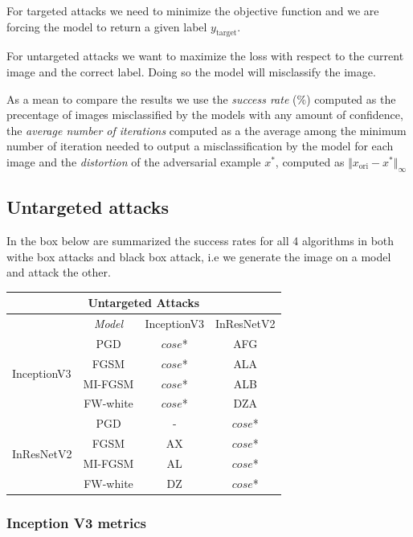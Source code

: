 \documentclass[10pt,twocolumn,letterpaper, english]{article}
\theoremstyle{definition}
\theoremstyle{plain}
\theoremstyle{plain}
\theoremstyle{plain}
\theoremstyle{plain}
\theoremstyle{remark}
\theoremstyle{remark}
\theoremstyle{definition}
\theoremstyle{definition}
\theoremstyle{definition}
\theoremstyle{definition}
\begin{document}
For targeted attacks we need to minimize the objective function and we are forcing the model to return a given label $y_{\text{target}}$.

For untargeted attacks we want to maximize the loss with respect to the current image and the correct label. Doing so the model will misclassify the image.

As a mean to compare the results we use the \textit{success rate} ($\%$) computed as the precentage of images misclassified by the models with any amount of confidence, the \textit{average number of iterations} computed as a the average among the minimum number of iteration needed to output a misclassification by the model for each image and the \textit{distortion} of the adversarial example $x^\ast$, computed as $\Vert x_{\text{ori}} - x^\ast \Vert_{\infty}$

\subsection{Untargeted attacks}

In the box below are summarized the success rates for all 4 algorithms in both withe box attacks and black box attack, i.e we generate the image on a model and attack the other.

\begin{tabular}{ |l|c|c|c| }
 \hline
 \multicolumn{4}{|c|}{Untargeted Attacks} \\
 \hline
  & \textit{Model} & InceptionV3 & InResNetV2 \\
 \hline
 
 \multirow{4}{5em}{InceptionV3} & PGD   & $cose$*   &  AFG\\
 & FGSM&   $cose$*  & ALA   \\
 & MI-FGSM & $cose$* & ALB\\
 & FW-white & $cose$* & DZA\\

 \hline
 \multirow{4}{5em}{InResNetV2} & PGD   & -   &  $cose$*\\
 & FGSM&   AX  & $cose$*   \\
 & MI-FGSM &AL & $cose$*\\
 & FW-white &DZ & $cose$*\\
 \hline
\end{tabular}

\subsubsection{Inception V3 metrics}
\end{document}
